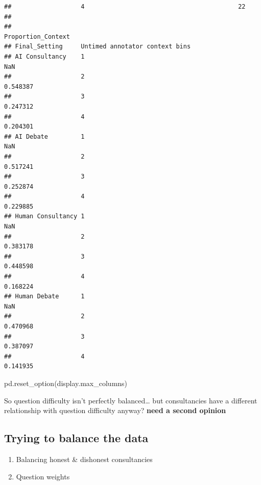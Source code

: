 \documentclass[
]{article}
\newenvironment{Shaded}{\begin{snugshade}}{\end{snugshade}}
\newcommand{\NormalTok}[1]{#1}
\newcommand{\StringTok}[1]{\textcolor[rgb]{0.31,0.60,0.02}{#1}}
\providecommand{\tightlist}{%
  \setlength{\itemsep}{0pt}\setlength{\parskip}{0pt}}
\begin{document}
\begin{verbatim}
##                   4                                          22   
## 
##                                                   Proportion_Context  
## Final_Setting     Untimed annotator context bins                      
## AI Consultancy    1                                              NaN  
##                   2                                         0.548387  
##                   3                                         0.247312  
##                   4                                         0.204301  
## AI Debate         1                                              NaN  
##                   2                                         0.517241  
##                   3                                         0.252874  
##                   4                                         0.229885  
## Human Consultancy 1                                              NaN  
##                   2                                         0.383178  
##                   3                                         0.448598  
##                   4                                         0.168224  
## Human Debate      1                                              NaN  
##                   2                                         0.470968  
##                   3                                         0.387097  
##                   4                                         0.141935
\end{verbatim}

\begin{Shaded}
\begin{Highlighting}[]
\NormalTok{pd.reset\_option(}\StringTok{\textquotesingle{}display.max\_columns\textquotesingle{}}\NormalTok{)}
\end{Highlighting}
\end{Shaded}

So question difficulty isn't perfectly balanced\ldots{} but
consultancies have a different relationship with question difficulty
anyway? \textbf{need a second opinion}

\hypertarget{trying-to-balance-the-data}{%
\subsection{Trying to balance the
data}\label{trying-to-balance-the-data}}

\begin{enumerate}
\def\labelenumi{\arabic{enumi}.}
\tightlist
\item
  Balancing honest \& dishonest consultancies
\item
  Question weights
\end{enumerate}
\end{document}
